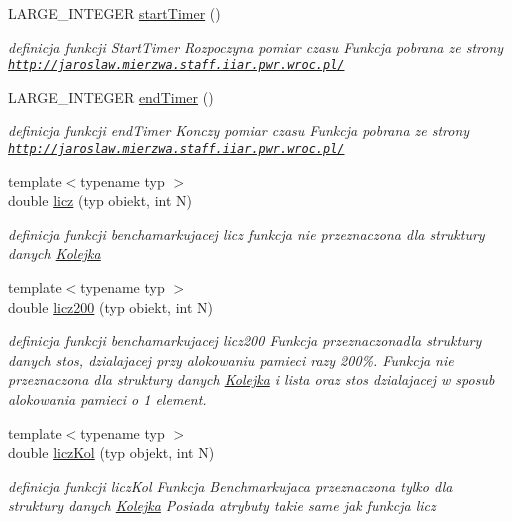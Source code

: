 \begin{DoxyCompactItemize}
\item 
L\+A\+R\+G\+E\+\_\+\+I\+N\+T\+E\+G\+E\+R \hyperlink{_stoper_8hh_a4fbb2a5fceb3efd577419fc87c6f3d07}{start\+Timer} ()
\begin{DoxyCompactList}\small\item\em definicja funkcji Start\+Timer Rozpoczyna pomiar czasu Funkcja pobrana ze strony \href{http://jaroslaw.mierzwa.staff.iiar.pwr.wroc.pl/}{\tt http\+://jaroslaw.\+mierzwa.\+staff.\+iiar.\+pwr.\+wroc.\+pl/} \end{DoxyCompactList}\item 
L\+A\+R\+G\+E\+\_\+\+I\+N\+T\+E\+G\+E\+R \hyperlink{_stoper_8hh_abd320a48742faf3aa6ad1a7e7c6b518b}{end\+Timer} ()
\begin{DoxyCompactList}\small\item\em definicja funkcji end\+Timer Konczy pomiar czasu Funkcja pobrana ze strony \href{http://jaroslaw.mierzwa.staff.iiar.pwr.wroc.pl/}{\tt http\+://jaroslaw.\+mierzwa.\+staff.\+iiar.\+pwr.\+wroc.\+pl/} \end{DoxyCompactList}\item 
{\footnotesize template$<$typename typ $>$ }\\double \hyperlink{_stoper_8hh_a4fac2b3b7d9ad98fc63291c183cde774}{licz} (typ obiekt, int N)
\begin{DoxyCompactList}\small\item\em definicja funkcji benchamarkujacej licz funkcja nie przeznaczona dla struktury danych \hyperlink{class_kolejka}{Kolejka} \end{DoxyCompactList}\item 
{\footnotesize template$<$typename typ $>$ }\\double \hyperlink{_stoper_8hh_acbfcf446d0eef3844d061cfc2c5b2f24}{licz200} (typ obiekt, int N)
\begin{DoxyCompactList}\small\item\em definicja funkcji benchamarkujacej licz200 Funkcja przeznaczonadla struktury danych stos, dzialajacej przy alokowaniu pamieci razy 200\%. Funkcja nie przeznaczona dla struktury danych \hyperlink{class_kolejka}{Kolejka} i lista oraz stos dzialajacej w sposub alokowania pamieci o 1 element. \end{DoxyCompactList}\item 
{\footnotesize template$<$typename typ $>$ }\\double \hyperlink{_stoper_8hh_ae0470166e6ffb50297e95736e5cb3ee2}{licz\+Kol} (typ objekt, int N)
\begin{DoxyCompactList}\small\item\em definicja funkcji licz\+Kol Funkcja Benchmarkujaca przeznaczona tylko dla struktury danych \hyperlink{class_kolejka}{Kolejka} Posiada atrybuty takie same jak funkcja licz \end{DoxyCompactList}\item 

\end{DoxyCompactItemize}

